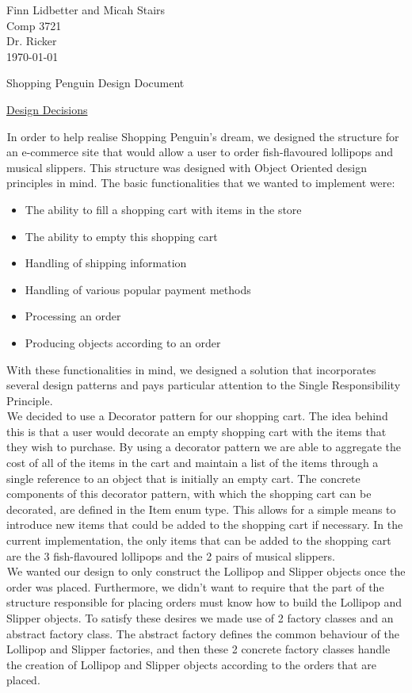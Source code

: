 \documentclass[letter paper, 12pt]{article}
\newcommand{\tab}{${}_{}$\hspace{0.2in}}
\newcommand{\noin}{\noindent}
\begin{document}
\noindent Finn Lidbetter and Micah Stairs\\
Comp 3721\\
Dr. Ricker\\
\today \bigskip
\begin{center}
	{\Large Shopping Penguin Design Document}
\end{center}
\underline{Design Decisions}\vspace{5pt}

\noin \tab In order to help realise Shopping Penguin's dream, we designed the structure for an e-commerce site that would allow a user to order fish-flavoured lollipops and musical slippers. This structure was designed with Object Oriented design principles in mind. The basic functionalities that we wanted to implement were:
\begin{itemize}
	\item The ability to fill a shopping cart with items in the store
	\item The ability to empty this shopping cart
	\item Handling of shipping information
	\item Handling of various popular payment methods
	\item Processing an order
	\item Producing objects according to an order
\end{itemize}
With these functionalities in mind, we designed a solution that incorporates several design patterns and pays particular attention to the Single Responsibility Principle. \\
\tab We decided to use a Decorator pattern for our shopping cart. The idea behind this is that a user would decorate an empty shopping cart with the items that they wish to purchase. By using a decorator pattern we are able to aggregate the cost of all of the items in the cart and maintain a list of the items through a single reference to an object that is initially an empty cart. The concrete components of this decorator pattern, with which the shopping cart can be decorated, are defined in the Item enum type. This allows for a simple means to introduce new items that could be added to the shopping cart if necessary. In the current implementation, the only items that can be added to the shopping cart are the 3 fish-flavoured lollipops and the 2 pairs of musical slippers.\\
\tab We wanted our design to only construct the Lollipop and Slipper objects once the order was placed. Furthermore, we didn't want to require that the part of the structure responsible for placing orders must know how to build the Lollipop and Slipper objects. To satisfy these desires we made use of 2 factory classes and an abstract factory class. The abstract factory defines the common behaviour of the Lollipop and Slipper factories, and then these 2 concrete factory classes handle the creation of Lollipop and Slipper objects according to the orders that are placed.\\
\end{document}
